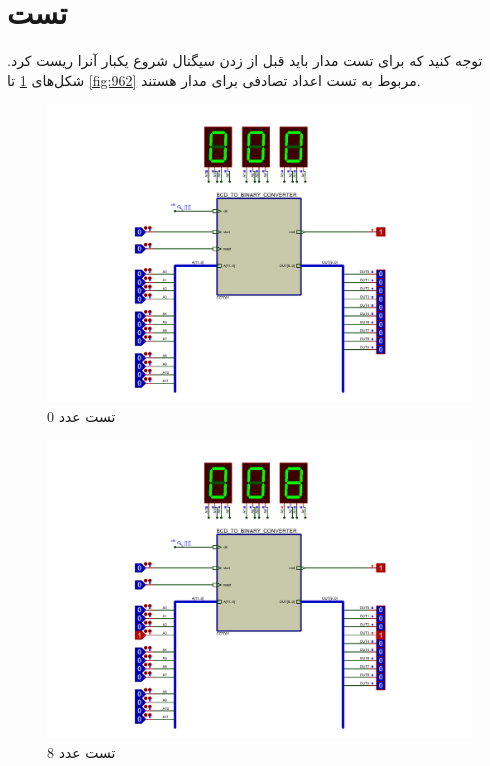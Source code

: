 \documentclass{article}
\begin{document}
\section{تست}
توجه کنید که برای تست مدار باید قبل از زدن سیگنال شروع یکبار آنرا ریست کرد.
شکل‌های \ref{fig:0} تا \ref{fig:962} مربوط به تست‌ اعداد تصادفی برای مدار هستند.

\begin{figure}
	\centering
	\includegraphics[scale=0.4]{./graphics/tests/0}
	\caption{تست عدد 0}
	\label{fig:0}
\end{figure}

\begin{figure}
	\centering
	\includegraphics[scale=0.4]{./graphics/tests/8}
	\caption{تست عدد 8}
	\label{fig:8}
\end{figure}
\end{document}
